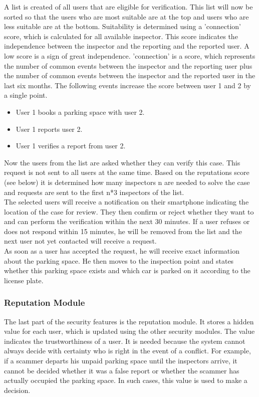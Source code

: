 \documentclass[
a4paper,     %
titlepage,   %
14pt         %
]{scrartcl}  %
\theoremstyle{mystyle}
\begin{document}
A list is created of all users that are eligible for verification. This list will now be sorted so that the users who are most suitable are at the top and users who are less suitable are at the bottom. Suitability is determined using a 'connection' score, which is calculated for all available inspector. This score indicates the independence between the inspector and the reporting and the reported user. A low score is a sign of great independence. 'connection' is a score, which represents the number of common events between the inspector and the reporting user plus the number of common events between the inspector and the reported user in the last six months. The following events increase the score between user 1 and 2 by a single point.
\begin{itemize}
\item User 1 books a parking space with user 2.
\item User 1 reports user 2.
\item User 1 verifies a report from user 2.
\end{itemize}

Now the users from the list are asked whether they can verify this case. This request is not sent to all users at the same time. Based on the reputations score (see below) it is determined how many inspectors n are needed to solve the case and requests are sent to the first n*3 inspectors of the list.\\

The selected users will receive a notification on their smartphone indicating the location of the case for review. They then confirm or reject whether they want to and can perform the verification within the next 30 minutes. If a user refuses or does not respond within 15 minutes, he will be removed from the list and the next user not yet contacted will receive a request.\\

As soon as a user has accepted the request, he will receive exact information about the parking space. He then moves to the inspection point and states whether this parking space exists and which car is parked on it according to the license plate.

\subsubsection{Reputation Module} The last part of the security features is the reputation module. It stores a hidden value for each user, which is updated using the other security modules. The value indicates the trustworthiness of a user. It is needed because the system cannot always decide with certainty who is right in the event of a conflict. For example, if a scammer departs his unpaid parking space until the inspectors arrive, it cannot be decided whether it was a false report or whether the scammer has actually occupied the parking space. In such cases, this value is used to make a decision. \\
\end{document}
